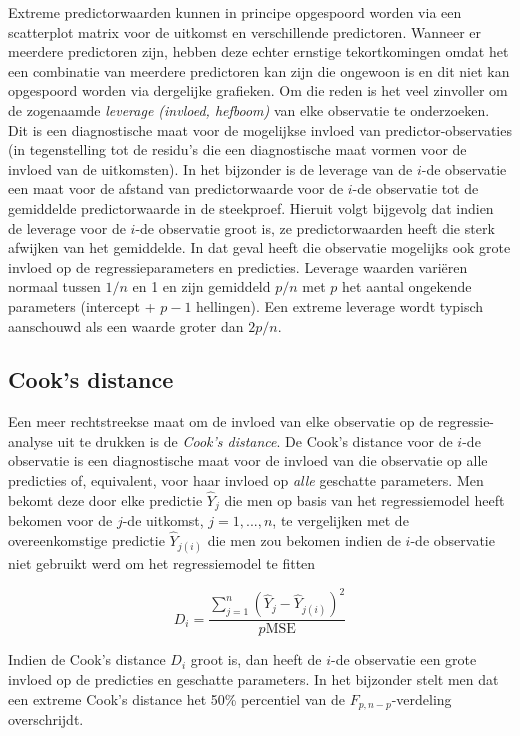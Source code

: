\documentclass[
  12pt,dutch,coursenotes]{book}
\theoremstyle{definition}
\theoremstyle{definition}
\theoremstyle{definition}
\theoremstyle{definition}
\theoremstyle{remark}
\begin{document}
Extreme predictorwaarden kunnen in principe opgespoord worden via een scatterplot matrix voor de uitkomst en verschillende predictoren. Wanneer er meerdere predictoren zijn, hebben deze echter ernstige tekortkomingen omdat het een combinatie van meerdere predictoren kan zijn die ongewoon is en dit niet kan opgespoord worden via dergelijke grafieken. Om die reden is het veel zinvoller om de zogenaamde \emph{leverage (invloed, hefboom)} van elke observatie te onderzoeken. Dit is een diagnostische maat voor de mogelijkse invloed van predictor-observaties (in tegenstelling tot de residu's die een diagnostische maat vormen voor de invloed van de uitkomsten). In het bijzonder is de leverage van de \(i\)-de observatie een maat voor de afstand van predictorwaarde voor de \(i\)-de observatie tot de gemiddelde predictorwaarde in de steekproef. Hieruit volgt bijgevolg dat indien de leverage voor de \(i\)-de observatie groot is, ze predictorwaarden heeft die sterk afwijken van het gemiddelde. In dat geval heeft die observatie mogelijks ook grote invloed op de regressieparameters en predicties. Leverage waarden variëren normaal tussen \(1/n\) en 1 en zijn gemiddeld \(p/n\) met \(p\) het aantal ongekende parameters (intercept + \(p-1\) hellingen). Een extreme leverage wordt typisch aanschouwd als een waarde groter dan \(2p/n\).

\hypertarget{cooks-distance}{%
\subsection{Cook's distance}\label{cooks-distance}}

Een meer rechtstreekse maat om de invloed van elke observatie op de regressie-analyse uit te drukken is de \emph{Cook's distance}. De Cook's distance voor de \(i\)-de observatie is een diagnostische maat voor de invloed van die observatie op alle predicties of, equivalent, voor haar invloed op \emph{alle} geschatte parameters. Men bekomt deze door elke predictie \(\hat{Y}_j\) die men op basis van het regressiemodel heeft bekomen voor de \(j\)-de uitkomst, \(j=1,...,n\), te vergelijken met de overeenkomstige predictie \(\hat{Y}_{j(i)}\) die men zou bekomen indien de \(i\)-de observatie niet gebruikt werd om het regressiemodel te fitten

\[
D_i=\frac{\sum_{j=1}^n(\hat{Y}_j-\hat{Y}_{j(i)})^2}{p\textrm{MSE}}
\]

Indien de Cook's distance \(D_i\) groot is, dan heeft de \(i\)-de observatie een grote invloed op de predicties en geschatte parameters. In het bijzonder stelt men dat een extreme Cook's distance het 50\% percentiel van de \(F_{p,n-p}\)-verdeling overschrijdt.
\end{document}
